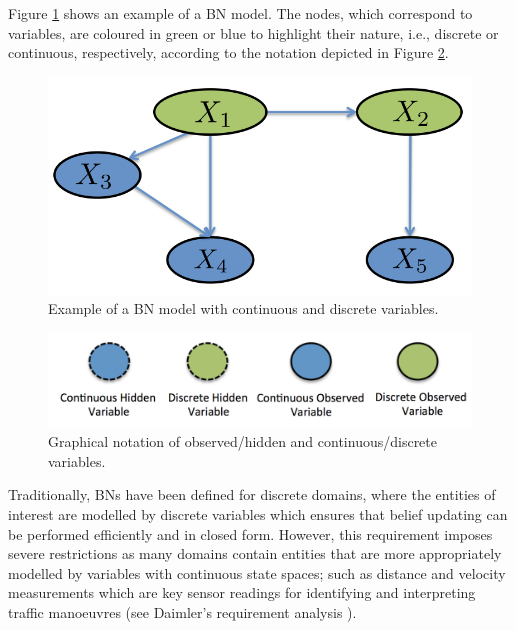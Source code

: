 Figure \ref{Figure:GeneralBayesianNetwork} shows an example of a BN model. The nodes, which correspond to variables, are coloured in green or blue to highlight their nature, i.e., discrete or continuous, respectively, according to the notation depicted in Figure \ref{Figure:PreliminariesNotation}. 

\begin{figure}[ht!]
\begin{center}
\includegraphics[scale=0.25]{./figures/GeneralBayesianNetwork}
\caption{\label{Figure:GeneralBayesianNetwork}Example of a BN model with continuous and discrete variables.
}
\end{center}
\end{figure}

\begin{figure}[ht!]
\begin{center}
\includegraphics[scale=0.4]{./figures/PreliminariesNotation}
\caption{\label{Figure:PreliminariesNotation}Graphical notation of observed/hidden and continuous/discrete variables.
}
\end{center}
\end{figure}


Traditionally, BNs have been defined for discrete domains, where the entities of interest are modelled by discrete variables which ensures that belief updating can be performed efficiently and in closed form. However, this requirement imposes severe restrictions as many domains contain entities that are more appropriately modelled by variables with continuous state spaces; such as distance and velocity measurements which are key sensor readings for identifying and interpreting traffic manoeuvres (see Daimler's requirement analysis \cite{Fer14}). 

